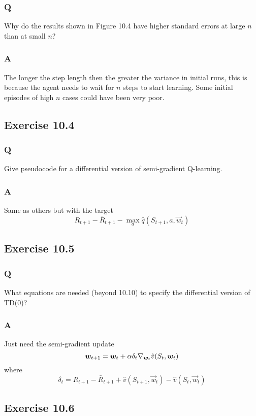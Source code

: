\subsubsection*{Q}
Why do the results shown in Figure 10.4 have higher standard errors at large $n$ than at small $n$?
\subsubsection*{A}
The longer the step length then the greater the variance in initial runs, this is because the agent needs to wait for $n$ steps to start learning. Some initial episodes of high $n$ cases could have been very poor.

\subsection{Exercise 10.4}
\subsubsection*{Q}
Give pseudocode for a differential version of semi-gradient Q-learning.

\subsubsection*{A}
Same as others but with the target
\[
    R_{t+1} - \bar{R}_{t+1} - \max_a \hat{q}(S_{t+1}, a, \vec{w}_t)
\]

\subsection{Exercise 10.5}
\subsubsection*{Q}
What equations are needed (beyond 10.10) to specify the differential version of TD(0)?

\subsubsection*{A}
Just need the semi-gradient update
\[
    \boldsymbol{w}_{t+1} = \boldsymbol{w}_{t} + \alpha \delta_t \nabla_{\boldsymbol{w}_t} \hat{v}(S_t, \boldsymbol{w}_t)
\]
where
\[
    \delta_t = R_{t+1} - \bar{R}_{t+1} + \hat{v}(S_{t+1}, \vec{w}_{t}) - \hat{v}(S_{t}, \vec{w}_t)
\]

\subsection{Exercise 10.6}
